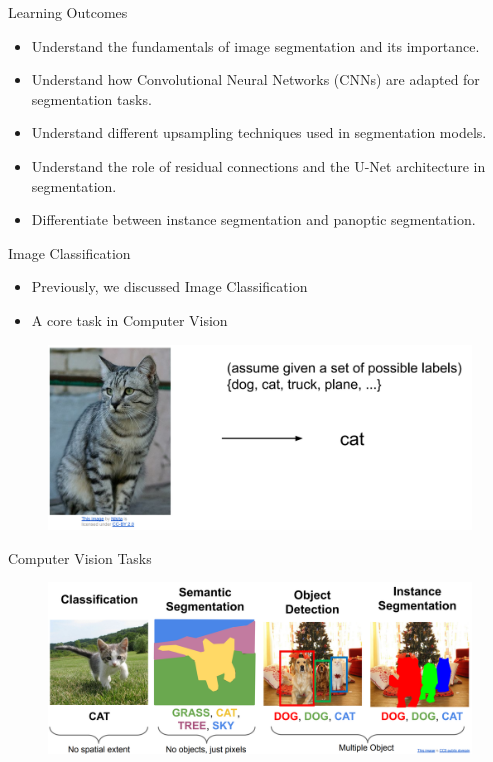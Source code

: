 \documentclass[10pt]{beamer}
\theoremstyle{remark}
\theoremstyle{definition}
\begin{document}
\begin{frame}{Learning Outcomes}
\begin{itemize}
    \item Understand the fundamentals of image segmentation and its importance.
    \item Understand how Convolutional Neural Networks (CNNs) are adapted for segmentation tasks.
    \item Understand different upsampling techniques used in segmentation models.
    \item Understand the role of residual connections and the U-Net architecture in segmentation.
    \item Differentiate between instance segmentation and panoptic segmentation.
\end{itemize}
\end{frame}




\begin{frame}{Image Classification}
\begin{itemize}
    \item Previously, we discussed Image Classification
    \item A core task in Computer Vision
\end{itemize}

\begin{figure}
\centering
\includegraphics[width=1.0\textwidth,height=0.7\textheight,keepaspectratio]{./images/classification.png}
\end{figure}
    
\end{frame}

\begin{frame}{Computer Vision Tasks}
\begin{figure}
\centering
\includegraphics[width=1.0\textwidth,height=1.0\textheight,keepaspectratio]{./images/tasks.png}
\end{figure}
    
\end{frame}
\end{document}
